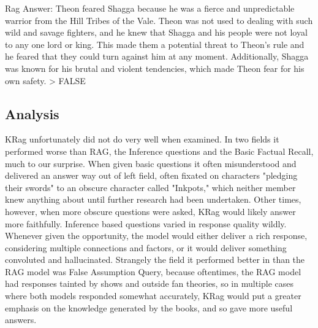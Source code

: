 Rag Answer:  Theon feared Shagga because he was a fierce and unpredictable warrior from the Hill Tribes of the Vale. Theon was not used to dealing with such wild and savage fighters, and he knew that Shagga and his people were not loyal to any one lord or king. This made them a potential threat to Theon's rule and he feared that they could turn against him at any moment. Additionally, Shagga was known for his brutal and violent tendencies, which made Theon fear for his own safety.
> FALSE

\subsection{Analysis}
KRag unfortunately did not do very well when examined. In two fields it performed worse than RAG, the Inference questions and the Basic Factual Recall, much to our surprise. When given basic questions it often misunderstood and delivered an answer way out of left field, often fixated on characters "pledging their swords" to an obscure character called "Inkpots," which neither member knew anything about until further research had been undertaken. Other times, however, when more obscure questions were asked, KRag would likely answer more faithfully. Inference based questions varied in response quality wildly. Whenever given the opportunity, the model would either deliver a rich response, considering multiple connections and factors, or it would deliver something convoluted and hallucinated. Strangely the field it performed better in than the RAG model was False Assumption Query, because oftentimes, the RAG model had responses tainted by shows and outside fan theories, so in multiple cases where both models responded somewhat accurately, KRag would put a greater emphasis on the knowledge generated by the books, and so gave more useful answers. 

\bigskip